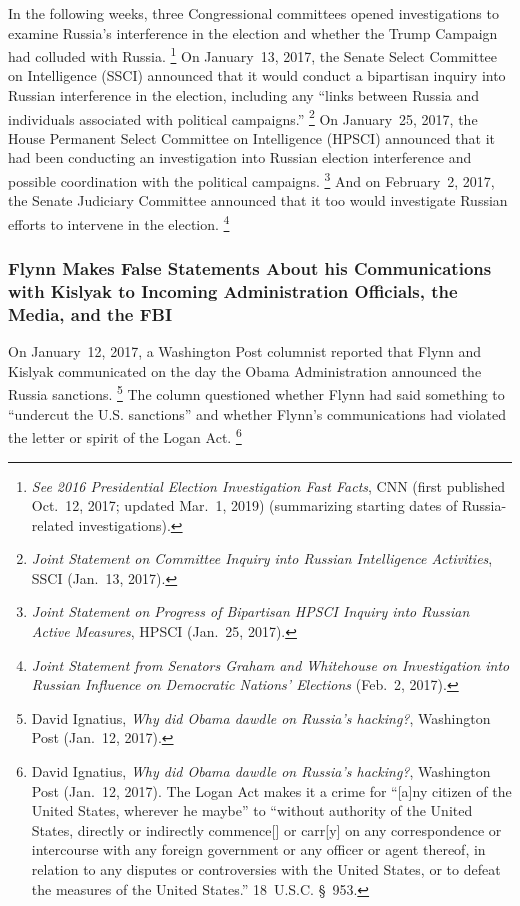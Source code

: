 In the following weeks, three Congressional committees opened investigations to examine Russia's interference in the election and whether the Trump Campaign had colluded with Russia.%
\footnote{\textit{See 2016 Presidential Election Investigation Fast Facts}, CNN (first published Oct.~12, 2017;
updated Mar.~1, 2019) (summarizing starting dates of Russia-related investigations).}
On January~13, 2017, the Senate Select Committee on Intelligence (SSCI) announced that it would conduct a bipartisan inquiry into Russian interference in the election, including any ``links between Russia and individuals associated with political campaigns.''%
\footnote{\textit{Joint Statement on Committee Inquiry into Russian Intelligence Activities}, SSCI (Jan.~13, 2017).}
On January~25, 2017, the House Permanent Select Committee on Intelligence (HPSCI) announced that it had been conducting an investigation into Russian election interference and possible coordination with the political campaigns.%
\footnote{\textit{Joint Statement on Progress of Bipartisan HPSCI Inquiry into Russian Active Measures}, HPSCI (Jan.~25, 2017).}
And on February~2, 2017, the Senate Judiciary Committee announced that it too would investigate Russian efforts to intervene in the election.%
\footnote{\textit{Joint Statement from Senators Graham and Whitehouse on Investigation into Russian Influence on Democratic Nations' Elections} (Feb.~2, 2017).}

\subsubsection{Flynn Makes False Statements About his Communications with Kislyak to Incoming Administration Officials, the Media, and the FBI}

On January~12, 2017, a Washington Post columnist reported that Flynn and Kislyak communicated on the day the Obama Administration announced the Russia sanctions.%
\footnote{David Ignatius, \textit{Why did Obama dawdle on Russia's hacking?}, Washington Post (Jan.~12, 2017).}
The column questioned whether Flynn had said something to ``undercut the U.S. sanctions'' and whether Flynn's communications had violated the letter or spirit of the Logan Act.%
\footnote{David Ignatius, \textit{Why did Obama dawdle on Russia's hacking?}, Washington Post (Jan.~12, 2017).
The Logan Act makes it a crime for ``[a]ny citizen of the United States, wherever he maybe'' to ``without authority of the United States, directly or indirectly commence[] or carr[y] on any correspondence or intercourse with any foreign government or any officer or agent thereof, in relation to any disputes or controversies with the United States, or to defeat the measures of the United States.'' 18~U.S.C. \S~953.}

